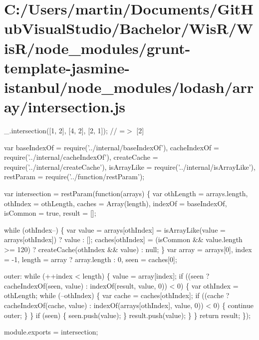 \hypertarget{_c_1_2_users_2martin_2_documents_2_git_hub_visual_studio_2_bachelor_2_wis_r_2_wis_r_2node_modulecb1784e1468311bf1ae37251b4bbee7c}{}\section{C\+:/\+Users/martin/\+Documents/\+Git\+Hub\+Visual\+Studio/\+Bachelor/\+Wis\+R/\+Wis\+R/node\+\_\+modules/grunt-\/template-\/jasmine-\/istanbul/node\+\_\+modules/lodash/array/intersection.\+js}
\+\_\+.\+intersection(\mbox{[}1, 2\mbox{]}, \mbox{[}4, 2\mbox{]}, \mbox{[}2, 1\mbox{]}); // =$>$ \mbox{[}2\mbox{]}


\begin{DoxyCodeInclude}
var baseIndexOf = require(\textcolor{stringliteral}{'../internal/baseIndexOf'}),
    cacheIndexOf = require(\textcolor{stringliteral}{'../internal/cacheIndexOf'}),
    createCache = require(\textcolor{stringliteral}{'../internal/createCache'}),
    isArrayLike = require(\textcolor{stringliteral}{'../internal/isArrayLike'}),
    restParam = require(\textcolor{stringliteral}{'../function/restParam'});

var intersection = restParam(\textcolor{keyword}{function}(arrays) \{
  var othLength = arrays.length,
      othIndex = othLength,
      caches = Array(length),
      indexOf = baseIndexOf,
      isCommon = \textcolor{keyword}{true},
      result = [];

  \textcolor{keywordflow}{while} (othIndex--) \{
    var value = arrays[othIndex] = isArrayLike(value = arrays[othIndex]) ? value : [];
    caches[othIndex] = (isCommon && value.length >= 120) ? createCache(othIndex && value) : null;
  \}
  var array = arrays[0],
      index = -1,
      length = array ? array.length : 0,
      seen = caches[0];

  outer:
  \textcolor{keywordflow}{while} (++index < length) \{
    value = array[index];
    \textcolor{keywordflow}{if} ((seen ? cacheIndexOf(seen, value) : indexOf(result, value, 0)) < 0) \{
      var othIndex = othLength;
      \textcolor{keywordflow}{while} (--othIndex) \{
        var cache = caches[othIndex];
        \textcolor{keywordflow}{if} ((cache ? cacheIndexOf(cache, value) : indexOf(arrays[othIndex], value, 0)) < 0) \{
          \textcolor{keywordflow}{continue} outer;
        \}
      \}
      \textcolor{keywordflow}{if} (seen) \{
        seen.push(value);
      \}
      result.push(value);
    \}
  \}
  \textcolor{keywordflow}{return} result;
\});

module.exports = intersection;
\end{DoxyCodeInclude}
 